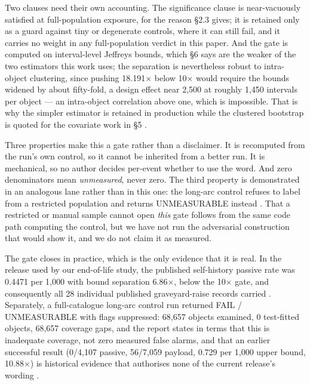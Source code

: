 \documentclass[11pt]{article}
\begin{document}
Two clauses need their own accounting. The significance clause is near-vacuously satisfied at full-population exposure, for the reason \S{}2.3 gives; it is retained only as a guard against tiny or degenerate controls, where it can still fail, and it carries no weight in any full-population verdict in this paper. And the gate is computed on interval-level Jeffreys bounds, which \S{}6 says are the weaker of the two estimators this work uses; the separation is nevertheless robust to intra-object clustering, since pushing 18.191$\times$ below 10$\times$ would require the bounds widened by about fifty-fold, a design effect near 2,500 at roughly 1,450 intervals per object --- an intra-object correlation above one, which is impossible. That is why the simpler estimator is retained in production while the clustered bootstrap is quoted for the covariate work in \S{}5%
.

Three properties make this a gate rather than a disclaimer. It is recomputed from the run's own control, so it cannot be inherited from a better run. It is mechanical, so no author decides per-event whether to use the word. And zero denominators mean \emph{unmeasured}, never zero. The third property is demonstrated in an analogous lane rather than in this one: the long-arc  control refuses to label from a restricted population and returns UNMEASURABLE instead%
. That a restricted or manual sample cannot open \emph{this} gate follows from the same code path computing the control, but we have not run the adversarial construction that would show it, and we do not claim it as measured.

The gate closes in practice, which is the only evidence that it is real. In the release used by our end-of-life study, the published self-history passive rate was 0.4471 per 1,000 with bound separation 6.86$\times$, below the 10$\times$ gate, and consequently all 28 individual published graveyard-raise records carried %
. Separately, a full-catalogue long-arc control run returned FAIL / UNMEASURABLE with flags suppressed: 68,657 objects examined, 0 test-fitted objects, 68,657 coverage gaps, and the report states in terms that this is inadequate coverage, not zero measured false alarms, and that an earlier successful result (0/4,107 passive, 56/7,059 payload, 0.729 per 1,000 upper bound, 10.88$\times$) is historical evidence that authorises none of the current release's wording%
.
\end{document}
